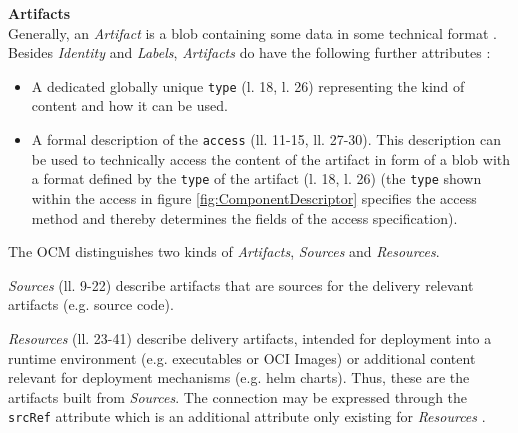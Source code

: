 \noindent\textbf{Artifacts}\\
Generally, an \emph{Artifact} is a blob containing some data in some technical format \cite{OCMSpec}. Besides \emph{Identity} and \emph{Labels}, \emph{Artifacts} do have the following further attributes \cite{OCMSpec}:
\begin{itemize}
\item A dedicated globally unique \lstinline|type| (l. 18, l. 26) representing the kind of content and how it can be used.
\item A formal description of the \lstinline|access| (ll. 11-15, ll. 27-30). This description can be used to technically access the content of the artifact in form of a blob with a format defined by the \lstinline|type| of the artifact (l. 18, l. 26) (the \lstinline|type| shown within the access in figure \ref{fig:ComponentDescriptor} specifies the access method and thereby determines the fields of the access specification).
\end{itemize}
The OCM distinguishes two kinds of \emph{Artifacts}, \emph{Sources} and \emph{Resources}.\par
\emph{Sources} (ll. 9-22) describe artifacts that are sources for the delivery relevant artifacts (e.g. source code).\par
\emph{Resources} (ll. 23-41) describe delivery artifacts, intended for deployment into a runtime environment (e.g. executables or OCI Images) or additional content relevant for deployment mechanisms (e.g. helm charts). Thus, these are the artifacts built from \emph{Sources}. The connection may be expressed through the \lstinline|srcRef| attribute which is an additional attribute only existing for \emph{Resources} \cite{OCMSpec}.\\

